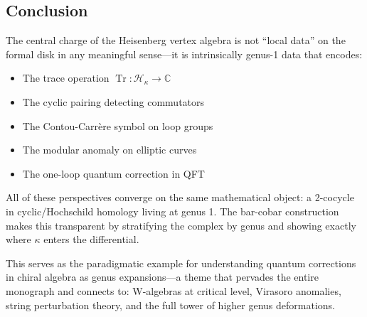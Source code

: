\subsection{Conclusion}

The central charge of the Heisenberg vertex algebra is not ``local data'' on the formal disk in any meaningful sense---it is intrinsically genus-1 data that encodes:
\begin{itemize}
\item The trace operation $\operatorname{Tr}: \mathcal{H}_\kappa \to \mathbb{C}$
\item The cyclic pairing detecting commutators
\item The Contou-Carrère symbol on loop groups
\item The modular anomaly on elliptic curves
\item The one-loop quantum correction in QFT
\end{itemize}

All of these perspectives converge on the same mathematical object: a 2-cocycle in cyclic/Hochschild homology living at genus 1. The bar-cobar construction makes this transparent by stratifying the complex by genus and showing exactly where $\kappa$ enters the differential.

This serves as the paradigmatic example for understanding quantum corrections in chiral algebra as genus expansions---a theme that pervades the entire monograph and connects to: W-algebras at critical level, Virasoro anomalies, string perturbation theory, and the full tower of higher genus deformations.
